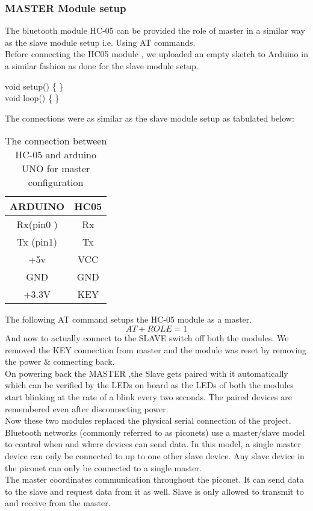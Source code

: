 \subsubsection*{MASTER Module setup}
The bluetooth module HC-05 can be provided the role of master in a similar way as the slave module setup i.e. Using AT commands.\\
Before connecting the HC05 module , we uploaded an empty sketch to Arduino in a similar fashion as done for the slave module setup. 
\begin{flushleft}
void setup() \big\{
  \big\}\\
void loop() \big\{
\big\}
\end{flushleft}
\justify The connections were as similar as the slave module setup as tabulated below:
\begin{table}[h]
\begin{center}
\begin{tabular}{ |c|c| }
\hline 
 ARDUINO     &   HC05\\
 \hline
Rx(pin0 )  &Rx\\
\hline
Tx (pin1) &   Tx\\
\hline
+5v     & VCC\\
\hline
GND     & GND\\
\hline
+3.3V  & KEY\\
\hline
\end{tabular}
\caption{The connection between HC-05 and arduino UNO for master configuration}
\end{center}
\end{table}
\justify The following AT command setups the HC-05 module as a master.
\begin{equation}
AT+ROLE=1
\end{equation}
\justify And now to actually connect to the SLAVE switch off both the modules. We removed the KEY connection from master and the module was reset by removing the power $\&$ connecting back.\\
On powering back the MASTER ,the Slave gets paired with it automatically which can be verified by the LEDs on board as the LEDs of both the modules start blinking at the rate of a blink every two seconds. The paired devices are remembered even after disconnecting power.\\
Now these two modules replaced the physical serial connection of the project.\\
Bluetooth networks (commonly referred to as piconets) use a master/slave model to control when and where devices can send data. In this model, a single master device can only be connected to up to one other slave device. Any slave device in the piconet can only be connected to a single master.\\
The master coordinates communication throughout the piconet. It can send data to the slave and request data from it as well. Slave is only allowed to transmit to and receive from the master.\\